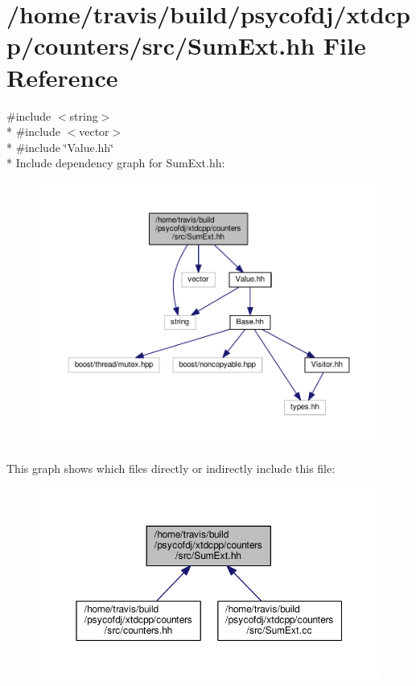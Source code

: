\hypertarget{SumExt_8hh}{\section{/home/travis/build/psycofdj/xtdcpp/counters/src/\-Sum\-Ext.hh File Reference}
\label{SumExt_8hh}
}
{\ttfamily \#include $<$string$>$}\\*
{\ttfamily \#include $<$vector$>$}\\*
{\ttfamily \#include \char`\"{}Value.\-hh\char`\"{}}\\*
Include dependency graph for Sum\-Ext.\-hh\-:
\nopagebreak
\begin{figure}[H]
\begin{center}
\leavevmode
\includegraphics[width=350pt]{SumExt_8hh__incl}
\end{center}
\end{figure}
This graph shows which files directly or indirectly include this file\-:
\nopagebreak
\begin{figure}[H]
\begin{center}
\leavevmode
\includegraphics[width=350pt]{SumExt_8hh__dep__incl}
\end{center}
\end{figure}
